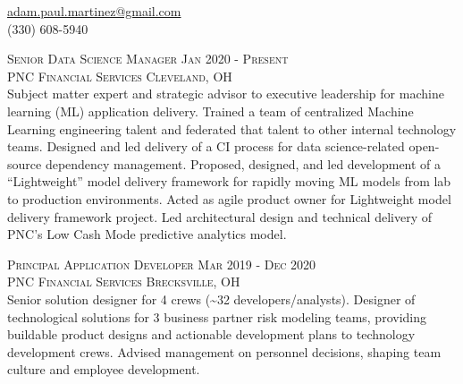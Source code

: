 \documentclass[letterpaper, 11pt]{article} %
\begin{document}
\pagestyle{empty} %



\vspace{-0.5em}

\begin{center}
\href{mailto:adam.paul.martinez@gmail.com}{adam.paul.martinez@gmail.com} \\
(330) 608-5940
\end{center}

\vspace{0.5em}

\justify

\textsc{Senior Data Science Manager \hfill Jan 2020 - Present} \\
\textsc{PNC Financial Services \hfill Cleveland, OH} \\
Subject matter expert and strategic advisor to executive leadership for machine learning (ML) application delivery.
Trained a team of centralized Machine Learning engineering talent and federated that talent to other internal technology teams.
Designed and led delivery of a CI process for data science-related open-source dependency management.
Proposed, designed, and led development of a ``Lightweight'' model delivery framework for rapidly moving ML models from lab to production environments.
Acted as agile product owner for Lightweight model delivery framework project.
Led architectural design and technical delivery of PNC's Low Cash Mode predictive analytics model.

\textsc{Principal Application Developer \hfill Mar 2019 - Dec 2020} \\
\textsc{PNC Financial Services \hfill Brecksville, OH} \\
Senior solution designer for 4 crews (\textasciitilde 32 developers/analysts).
Designer of technological solutions for 3 business partner risk modeling teams, providing buildable product designs and actionable development plans to technology development crews.
Advised management on personnel decisions, shaping team culture and employee development.
\end{document}
